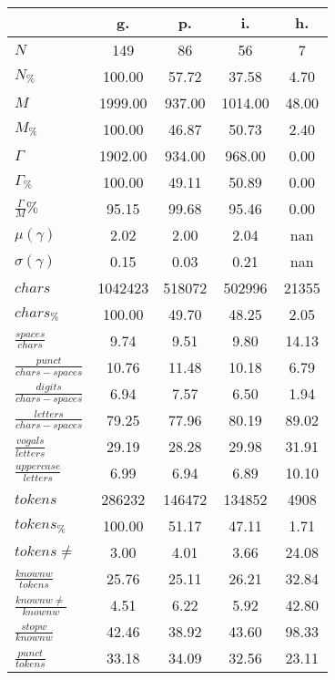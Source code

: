 \begin{table}[h!]
\begin{center}
\begin{tabular}{| l || c | c | c | c |}\hline
 & {\bf g.} & {\bf p.} & {\bf i.} & {\bf h.} \\\hline\hline
$N$ & 149  & 86  & 56  & 7 \\
$N_{\%}$ & 100.00  & 57.72  & 37.58  & 4.70 \\\hline
$M$ & 1999.00  & 937.00  & 1014.00  & 48.00 \\
$M_{\%}$ & 100.00  & 46.87  & 50.73  & 2.40 \\\hline
$\Gamma$ & 1902.00  & 934.00  & 968.00  & 0.00 \\
$\Gamma_{\%}$ & 100.00  & 49.11  & 50.89  & 0.00 \\\hline
$\frac{\Gamma}{M}\%$ & 95.15  & 99.68  & 95.46  & 0.00 \\
$\mu(\gamma)$ & 2.02  & 2.00  & 2.04  & nan \\
$\sigma(\gamma)$ & 0.15  & 0.03  & 0.21  & nan \\\hline\hline
$chars$ & 1042423  & 518072  & 502996  & 21355 \\
$chars_{\%}$ & 100.00  & 49.70  & 48.25  & 2.05 \\\hline
$\frac{spaces}{chars}$ & 9.74  & 9.51  & 9.80  & 14.13 \\
$\frac{punct}{chars-spaces}$ & 10.76  & 11.48  & 10.18  & 6.79 \\
$\frac{digits}{chars-spaces}$ & 6.94  & 7.57  & 6.50  & 1.94 \\\hline
$\frac{letters}{chars-spaces}$ & 79.25  & 77.96  & 80.19  & 89.02 \\
$\frac{vogals}{letters}$ & 29.19  & 28.28  & 29.98  & 31.91 \\
$\frac{uppercase}{letters}$ & 6.99  & 6.94  & 6.89  & 10.10 \\\hline\hline
$tokens$ & 286232  & 146472  & 134852  & 4908 \\
$tokens_{\%}$ & 100.00  & 51.17  & 47.11  & 1.71 \\
$tokens \neq$ & 3.00  & 4.01  & 3.66  & 24.08 \\\hline
$\frac{knownw}{tokens}$ & 25.76  & 25.11  & 26.21  & 32.84 \\
$\frac{knownw \neq}{knownw}$ & 4.51  & 6.22  & 5.92  & 42.80 \\\hline
$\frac{stopw}{knownw}$ & 42.46  & 38.92  & 43.60  & 98.33 \\
$\frac{punct}{tokens}$ & 33.18  & 34.09  & 32.56  & 23.11 \\

\end{tabular}
\end{center}
\end{table}
